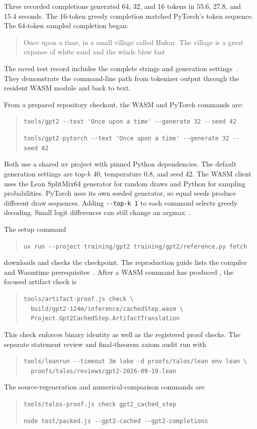\documentclass[11pt]{article}
\newcommand{\longcode}[1]{\texttt{\seqsplit{#1}}}
\begin{document}
Three recorded completions generated 64, 32, and 16 tokens in 55.6, 27.8, and 15.4 seconds.  The 16-token greedy completion matched PyTorch's token sequence.  The 64-token sampled completion began:
\begin{quote}
Once upon a time, in a small village called Hukur. The village is a great expanse of white sand and the winds blow fast
\end{quote}
The saved test record includes the complete strings and generation settings~\cite{tests}.  They demonstrate the command-line path from tokenizer output through the resident WASM module and back to text.

From a prepared repository checkout, the WASM and PyTorch commands are:
\begin{quote}\small\ttfamily
\verb|tools/gpt2 --text 'Once upon a time' --generate 32 --seed 42|

\verb|tools/gpt2-pytorch --text 'Once upon a time' --generate 32 --seed 42|
\end{quote}
Both use a shared uv project with pinned Python dependencies.  The default generation settings are top-$k$ 40, temperature 0.8, and seed 42.  The WASM client uses the Lean SplitMix64 generator for random draws and Python for sampling probabilities.  PyTorch uses its own seeded generator, so equal seeds produce different draw sequences.  Adding \verb|--top-k 1| to each command selects greedy decoding.  Small logit differences can still change an argmax~\cite{driver}.

The setup command
\begin{quote}\small\ttfamily
\verb|uv run --project training/gpt2 training/gpt2/reference.py fetch|
\end{quote}
downloads and checks the checkpoint.  The reproduction guide lists the compiler and Wasmtime prerequisites~\cite{guide}.  After a WASM command has produced \longcode{build/gpt2-124m/inference/cachedStep.wasm}, the focused artifact check is
\begin{quote}\small\ttfamily
\verb|tools/artifact-proof.js check \|\\
\verb|  build/gpt2-124m/inference/cachedStep.wasm \|\\
\verb|  Project.Gpt2CachedStep.ArtifactTranslation|
\end{quote}
This check enforces binary identity as well as the registered proof checks.  The separate statement review and final-theorem axiom audit run with
\begin{quote}\small\ttfamily
\verb|tools/leanrun --timeout 3m lake -d proofs/talos/lean env lean \|\\
\verb|  proofs/talos/reviews/gpt2-2026-09-19.lean|
\end{quote}
The source-regeneration and numerical-comparison commands are
\begin{quote}\small\ttfamily
\verb|tools/talos-proof.js check gpt2_cached_step|

\verb|node test/packed.js --gpt2-cached --gpt2-completions|
\end{quote}
\end{document}
